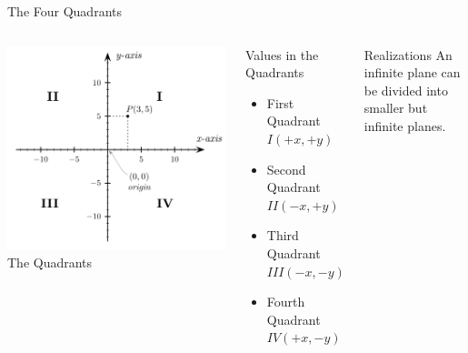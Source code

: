 \documentclass[14pt,aspectratio=169]{beamer}
\begin{document}
\begin{frame}{The Four Quadrants}
  \begin{columns}
   \centering
    \includegraphics[width=1\textwidth]{image02}\\The Quadrants
    \begin{block}{Values in the Quadrants}
     \begin{itemize}
      \item First Quadrant $I(+x,+y)$
      \item Second Quadrant $II(-x,+y)$
      \item Third Quadrant $III(-x,-y)$
      \item Fourth Quadrant $IV(+x,-y)$

     \end{itemize}

    \end{block}

    \begin{exampleblock}{Realizations}
     An infinite plane can be divided into smaller but infinite planes.
    \end{exampleblock}


  \end{columns}

\end{frame}
\end{document}

